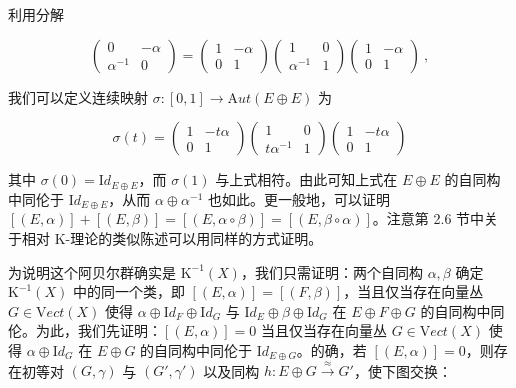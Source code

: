 \documentclass[11pt,a4paper]{ctexart}
\begin{document}
利用分解

\[\left(\begin{array}{cc}0 & -\alpha\\ \alpha^{-1}&0\end{array}\right)
=\left(\begin{array}{cc}1 & -\alpha\\ 0&1\end{array}\right)
\left(\begin{array}{cc}1 & 0\\ \alpha^{-1}&1\end{array}\right)
\left(\begin{array}{cc}1 & -\alpha\\ 0&1\end{array}\right)\ ,\]

我们可以定义连续映射 \(\sigma:[0,1]\rightarrow {\mathrm Aut}(E\oplus E)\) 为

\[\sigma(t)=\left(\begin{array}{cc}1 & -t\alpha\\ 0&1\end{array}\right)
\left(\begin{array}{cc}1 & 0\\ t\alpha^{-1}&1\end{array}\right)
\left(\begin{array}{cc}1 & -t\alpha\\ 0&1\end{array}\right)\]

其中 \(\sigma(0)={\mathrm Id}_{E\oplus E}\)，而 \(\sigma(1)\) 与上式相符。由此可知上式在 \(E\oplus E\) 的自同构中同伦于 \({\mathrm Id}_{E\oplus E}\)，从而 \(\alpha\oplus\alpha^{-1}\) 也如此。更一般地，可以证明 \([(E,\alpha)]+[(E,\beta)]=[(E,\alpha\circ\beta)]=[(E,\beta\circ\alpha)]\)。注意第 2.6 节中关于相对 K-理论的类似陈述可以用同样的方式证明。

为说明这个阿贝尔群确实是 \({\mathrm K}^{-1}(X)\)，我们只需证明：两个自同构 \(\alpha,\beta\) 确定 \({\mathrm K}^{-1}(X)\) 中的同一个类，即 \([(E,\alpha)]=[(F,\beta)]\)，当且仅当存在向量丛 \(G\in {\mathrm Vect}(X)\) 使得 \(\alpha\oplus {\mathrm Id}_{F}\oplus {\mathrm Id}_{G}\) 与 \({\mathrm Id}_{E}\oplus \beta \oplus {\mathrm Id}_{G}\) 在 \(E\oplus F\oplus G\) 的自同构中同伦。为此，我们先证明：\([(E,\alpha)]=0\) 当且仅当存在向量丛 \(G\in{\mathrm Vect}(X)\) 使得 \(\alpha\oplus {\mathrm Id}_{G}\) 在 \(E\oplus G\) 的自同构中同伦于 \({\mathrm Id}_{E\oplus G}\)。的确，若 \([(E,\alpha)]=0\)，则存在初等对 \((G,\gamma)\) 与 \((G',\gamma')\) 以及同构 \(h:E\oplus G\stackrel{\approx}{\longrightarrow}G'\)，使下图交换：
\end{document}
